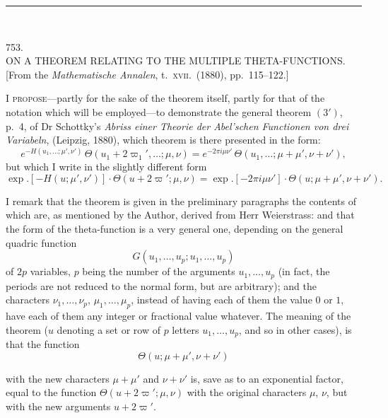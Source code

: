 \documentclass[11pt,a4paper]{article}
\begin{document}
\bigskip
\noindent\rule{0.35\textwidth}{0.4pt}\\[2pt]


\bigskip

\begin{center}
\textsc{753.}\\[6pt]
\textsc{ON A THEOREM RELATING TO THE MULTIPLE THETA-FUNCTIONS.}\\[6pt]
[From the \emph{Mathematische Annalen}, t.\ \textsc{xvii}.\ (1880),
pp.\ 115--122.]
\end{center}

\bigskip

\noindent
I \textsc{propose}---partly for the sake of the theorem itself, partly for
that of the notation which will be employed---to demonstrate the general
theorem $(3')$, p.\ 4, of Dr Schottky's \emph{Abriss einer Theorie der
Abel'schen Functionen von drei Variabeln}, (Leipzig, 1880), which theorem is
there presented in the form:
\[
  e^{-H(u_{1}, \ldots; \mu', \nu')}\,
   \Theta(u_{1} + 2\varpi_{1}', \ldots; \mu, \nu)
   = e^{-2\pi i \mu \nu'}\,
   \Theta(u_{1}, \ldots; \mu + \mu', \nu + \nu'),
  \tag{3'}
\]
but which I write in the slightly different form
\[
  \exp.[-H(u; \mu', \nu')] \cdot \Theta(u + 2\varpi'; \mu, \nu)
   = \exp.[-2\pi i \mu \nu'] \cdot \Theta(u; \mu + \mu', \nu + \nu').
\]

I remark that the theorem is given in the preliminary paragraphs the contents
of which are, as mentioned by the Author, derived from Herr Weierstrass: and
that the form of the theta-function is a very general one, depending on the
general quadric function
\[
  G(u_{1}, \ldots, u_{p}; u_{1}, \ldots, u_{p})
\]
of $2p$ variables, $p$ being the number of the arguments $u_{1}, \ldots, u_{p}$
(in fact, the periods are not reduced to the normal form, but are arbitrary);
and the characters $\nu_{1}, \ldots, \nu_{p}$, $\mu_{1}, \ldots, \mu_{p}$,
instead of having each of them the value $0$ or $1$, have each of them any
integer or fractional value whatever.  The meaning of the theorem ($u$
denoting a set or row of $p$ letters $u_{1}, \ldots, u_{p}$, and so in other
cases), is that the function
\[
  \Theta(u; \mu + \mu', \nu + \nu')
\]

with the new characters $\mu + \mu'$ and $\nu + \nu'$ is, save as to an
exponential factor, equal to the function $\Theta(u + 2\varpi'; \mu, \nu)$
with the original characters $\mu$, $\nu$, but with the new arguments
$u + 2\varpi'$.
\end{document}
